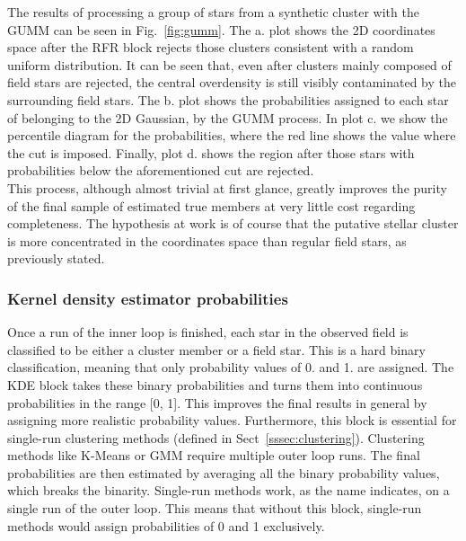 \documentclass[draft]{aa}
\begin{document}
 The results of processing a group of stars from a synthetic cluster with the
 GUMM can be seen in Fig.~\ref{fig:gumm}.
 The a. plot shows the 2D coordinates space after the RFR
 block rejects those clusters consistent with a random uniform distribution.
 It can be seen that, even after clusters mainly composed of field stars are
 rejected, the central overdensity is still visibly contaminated by the
 surrounding field stars. The b. plot shows the probabilities assigned to each
 star of belonging to the 2D Gaussian, by the GUMM process. In plot c. we show
 the percentile diagram for the probabilities, where the red line shows the
 value where the cut is imposed. Finally, plot d. shows the region after those
 stars with probabilities below the aforementioned cut are rejected.\\

 This process, although almost trivial at first glance, greatly improves the
 purity of the final sample of estimated true members at very little cost
 regarding completeness. The hypothesis at work is of course that the putative
 stellar cluster is more concentrated in the coordinates space than regular
 field stars, as previously stated.



\subsubsection{Kernel density estimator probabilities}
 \label{sssec:kde-probs}

 Once a run of the inner loop is finished, each star in the observed field is
 classified to be either a cluster member or a field star. This is a hard
 binary classification, meaning that only probability values of 0. and 1. are
 assigned. The KDE block takes these binary probabilities and turns them into
 continuous probabilities in the range [0, 1]. This improves the final results
 in general by assigning more realistic probability values. Furthermore, this
 block is essential for single-run clustering methods (defined in
 Sect~\ref{sssec:clustering}). Clustering methods like K-Means or GMM
 require multiple outer loop runs. The final probabilities are then estimated
 by averaging all the binary probability values, which breaks the binarity.
 Single-run methods work, as the name indicates, on a single run of the outer
 loop. This means that without this block, single-run methods would assign
 probabilities of 0 and 1 exclusively.\\
\end{document}
